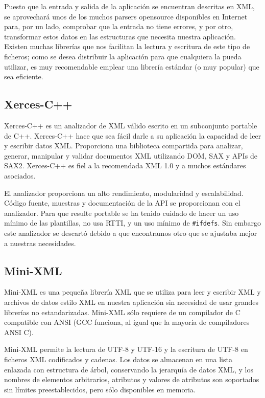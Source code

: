 Puesto que la entrada y salida de la aplicación \CSUO{} se encuentran
descritas en XML, se aprovechará unos de los muchos parsers opensource
disponibles en Internet para, por un lado, comprobar que la entrada no tiene
errores, y por otro, transformar estos datos en las estructuras que necesita
nuestra aplicación. Existen muchas librerías que nos facilitan la lectura y
escritura de este tipo de ficheros; como se desea distribuir la aplicación para
que cualquiera la pueda utilizar, es muy recomendable emplear una librería
estándar (o muy popular) que sea eficiente.

\subsection{Xerces-C++}

Xerces-C++ \cite{Web:Xerces} es un analizador de XML válido escrito en un
subconjunto portable de C++. Xerces-C++ hace que sea fácil darle a su aplicación
la capacidad de leer y escribir datos XML. Proporciona una biblioteca compartida
para analizar, generar, manipular y validar documentos XML utilizando DOM, SAX y
APIs de SAX2. Xerces-C++ es fiel a la recomendada XML 1.0 y a muchos estándares
asociados.

El analizador proporciona un alto rendimiento, modularidad y escalabilidad.
Código fuente, muestras y documentación de la API se proporcionan con el
analizador. Para que resulte portable se ha tenido cuidado de hacer un uso
mínimo de las plantillas, no usa RTTI, y un uso mínimo de \texttt{\#ifdefs}. Sin
embargo este analizador se descartó debido a que encontramos otro que se
ajustaba mejor a nuestras necesidades.

\subsection{Mini-XML}

Mini-XML \cite{Web:Mini-XML} es una pequeña librería XML que se utiliza
para leer y escribir XML y archivos de datos estilo XML en nuestra aplicación
sin necesidad de usar grandes librerías no estandarizadas. Mini-XML sólo
requiere de un compilador de C compatible con ANSI (GCC funciona, al igual que 
la mayoría de compiladores ANSI C).

Mini-XML permite la lectura de UTF-8 y UTF-16 y la escritura de UTF-8 en
ficheros XML codificados y cadenas. Los datos se almacenan en una lista enlazada
con estructura de árbol, conservando la jerarquía de datos XML, y los nombres de 
elementos arbitrarios, atributos y valores de atributos son soportados sin
límites preestablecidos, pero sólo disponibles en memoria.

